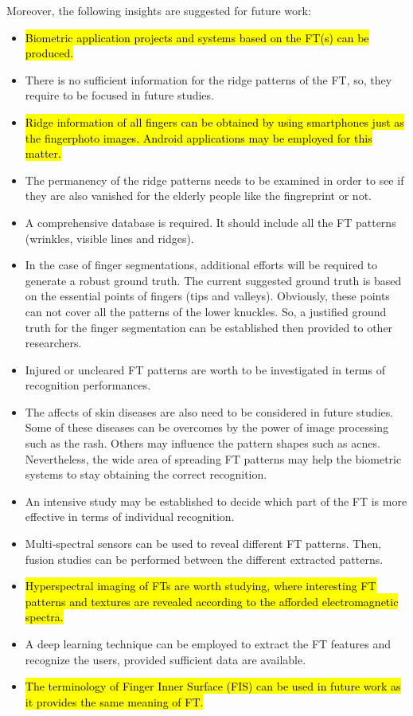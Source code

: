 \documentclass[review]{elsarticle}
\begin{document}
	Moreover, the following insights are suggested for future work:
	\begin{itemize}
		\item \hl{Biometric application projects and systems based on the FT(s) can be produced.}
		\item There is no sufficient information for the ridge patterns of the FT, so, they require to be focused in future studies. 
		\item \hl{Ridge information of all fingers can be obtained by using smartphones just as the fingerphoto images. Android applications may be employed for this matter.}
		\item The permanency of the ridge patterns needs to be examined in order to see if they are also vanished for the elderly people like the fingreprint or not.
		\item A comprehensive database is required. It should include all the FT patterns (wrinkles, visible lines and ridges).
		\item In the case of finger segmentations, additional efforts will be required to generate a robust ground truth. The current suggested ground truth is based on the essential points of fingers (tips and valleys). Obviously, these points can not cover all the patterns of the lower knuckles. So, a justified ground truth for the finger segmentation can be established then provided to other researchers. 
		\item Injured or uncleared FT patterns are worth to be investigated in terms of recognition performances.
		\item The affects of skin diseases are also need to be considered in future studies. Some of these diseases can be overcomes by the power of image processing such as the rash. Others may influence the pattern shapes such as acnes. Nevertheless, the wide area of spreading FT patterns may help the biometric systems to stay obtaining the correct recognition.
		\item An intensive study may be established to decide which part of the FT is more effective in terms of individual recognition. 
		\item Multi-spectral sensors can be used to reveal different FT patterns. Then, fusion studies can be performed between the different extracted patterns.
		\item \hl{Hyperspectral imaging of FTs are worth studying, where interesting FT patterns and textures are revealed according to the afforded electromagnetic spectra.}
		\item A deep learning technique can be employed to extract the FT features and recognize the users, provided sufficient data are available.
		\item \hl{The terminology of Finger Inner Surface (FIS) can be used in future work as it provides the same meaning of FT.}
\end{itemize}
\end{document}
